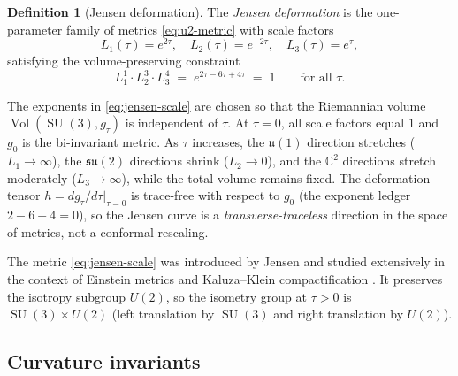 \documentclass[12pt]{article}
\theoremstyle{definition}
\newtheorem{definition}[theorem]{Definition}
\theoremstyle{remark}
\DeclareMathOperator{\Vol}{Vol}
\DeclareMathOperator{\SU}{SU}
\begin{document}
\begin{definition}[Jensen deformation]
The \emph{Jensen deformation} is the one-parameter family of metrics
\eqref{eq:u2-metric} with scale factors
\begin{equation}\label{eq:jensen-scale}
  L_1(\tau) = e^{2\tau},\quad
  L_2(\tau) = e^{-2\tau},\quad
  L_3(\tau) = e^{\tau},
\end{equation}
satisfying the volume-preserving constraint
\begin{equation}\label{eq:volume-preserving}
  L_1^1 \cdot L_2^3 \cdot L_3^4
  \;=\; e^{2\tau - 6\tau + 4\tau}
  \;=\; 1
  \qquad\text{for all } \tau.
\end{equation}
\end{definition}

The exponents in \eqref{eq:jensen-scale} are chosen so that the Riemannian volume
$\Vol(\SU(3), g_\tau)$ is independent of $\tau$.  At $\tau = 0$, all
scale factors equal $1$ and $g_0$ is the bi-invariant metric.  As
$\tau$ increases, the $\mathfrak{u}(1)$ direction stretches
($L_1 \to \infty$), the $\mathfrak{su}(2)$ directions shrink
($L_2 \to 0$), and the $\mathbb{C}^2$ directions stretch
moderately ($L_3 \to \infty$), while the total volume remains fixed.
The deformation tensor $h = dg_\tau/d\tau|_{\tau=0}$ is trace-free with
respect to $g_0$ (the exponent ledger $2 - 6 + 4 = 0$), so the Jensen
curve is a \emph{transverse-traceless} direction in the space of
metrics, not a conformal rescaling.

The metric \eqref{eq:jensen-scale} was introduced by Jensen
\cite{Jensen1973} and studied extensively in the context of
Einstein metrics and Kaluza--Klein compactification
\cite{Baptista2024, DuffNilssonPope}.  It preserves
the isotropy subgroup $U(2)$, so the isometry group at $\tau > 0$
is $\SU(3) \times U(2)$ (left translation by $\SU(3)$ and right
translation by $U(2)$).


\subsection{Curvature invariants}
\end{document}
